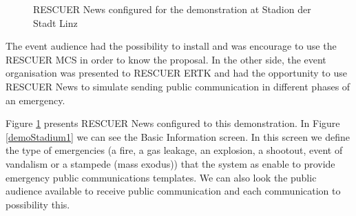 \begin{figure}[!h]
\centering
{}
\quad %
\caption{RESCUER News configured for the demonstration at Stadion der Stadt Linz}
\label{demoStadium}
\end{figure}

The event audience had the possibility to install and was encourage to use the RESCUER MCS  in order to know the proposal. In the other side, the event organisation was presented to RESCUER ERTK and had the opportunity to use RESCUER News to simulate sending public communication in different phases of an emergency. 

Figure \ref{demoStadium} presents RESCUER News configured to this demonstration. In Figure \ref{demoStadium1} we can see the Basic Information screen. In this screen we define the type of emergencies (a fire, a gas leakage, an explosion, a shootout, event of vandalism or a stampede (mass exodus)) that the system as enable to provide emergency public communications templates. We can also look the public audience available to receive public communication and each communication to possibility this. 


